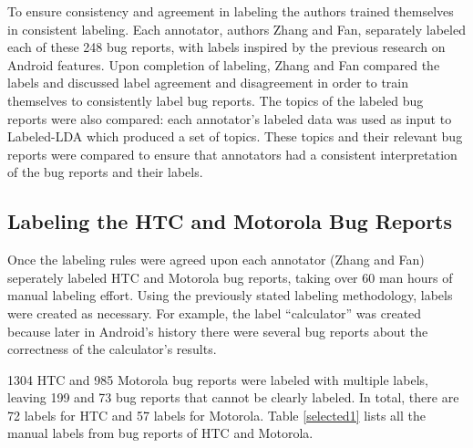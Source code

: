 \documentclass[10pt, conference, compsocconf]{IEEEtran}
\begin{document}
To ensure consistency and agreement in labeling the authors trained
themselves in consistent labeling.
Each annotator, authors Zhang and Fan, separately labeled each of these 248 bug reports, 
with labels inspired by the previous research on Android
features. 
Upon completion of labeling, 
 Zhang and Fan compared the labels
and discussed label agreement and
disagreement in order to train themselves to consistently label bug
reports.
The topics of the labeled bug reports were also compared: each annotator's labeled data was used as input to
 Labeled-LDA which produced a set of topics.
These topics and their relevant bug reports were compared to ensure
that annotators had a 
consistent interpretation of the bug reports and their labels.




\subsection{Labeling the HTC and Motorola Bug Reports}

Once the labeling rules were agreed upon each annotator (Zhang and Fan)
seperately labeled HTC and Motorola bug reports, taking over 60 man
hours of manual labeling effort.
Using the previously stated labeling methodology, labels were created as necessary.
For example, the label ``calculator'' was created because later in
Android's history there were 
several bug reports about the correctness of the
calculator's results. 


1304 HTC and 985 Motorola bug reports were labeled with multiple
labels, leaving 199 and 73 bug reports that cannot be clearly labeled.
In total, there are 72 labels for HTC and 57 labels for Motorola.
Table \ref{selected1} lists all the manual labels from bug reports of HTC
and Motorola.
\end{document}
